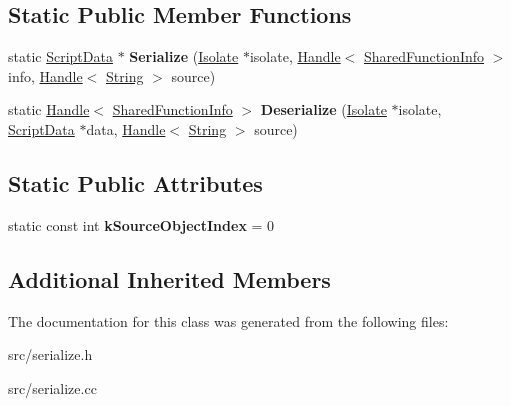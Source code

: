 \subsection*{Static Public Member Functions}
\begin{DoxyCompactItemize}
\item 
\hypertarget{classv8_1_1internal_1_1_code_serializer_a50ee2c69501e7cbac4400369ac2d88d6}{}static \hyperlink{classv8_1_1internal_1_1_script_data}{Script\+Data} $\ast$ {\bfseries Serialize} (\hyperlink{classv8_1_1internal_1_1_isolate}{Isolate} $\ast$isolate, \hyperlink{classv8_1_1internal_1_1_handle}{Handle}$<$ \hyperlink{classv8_1_1internal_1_1_shared_function_info}{Shared\+Function\+Info} $>$ info, \hyperlink{classv8_1_1internal_1_1_handle}{Handle}$<$ \hyperlink{classv8_1_1internal_1_1_string}{String} $>$ source)\label{classv8_1_1internal_1_1_code_serializer_a50ee2c69501e7cbac4400369ac2d88d6}

\item 
\hypertarget{classv8_1_1internal_1_1_code_serializer_ab8416a1971c2012355075bfefd659383}{}static \hyperlink{classv8_1_1internal_1_1_handle}{Handle}$<$ \hyperlink{classv8_1_1internal_1_1_shared_function_info}{Shared\+Function\+Info} $>$ {\bfseries Deserialize} (\hyperlink{classv8_1_1internal_1_1_isolate}{Isolate} $\ast$isolate, \hyperlink{classv8_1_1internal_1_1_script_data}{Script\+Data} $\ast$data, \hyperlink{classv8_1_1internal_1_1_handle}{Handle}$<$ \hyperlink{classv8_1_1internal_1_1_string}{String} $>$ source)\label{classv8_1_1internal_1_1_code_serializer_ab8416a1971c2012355075bfefd659383}

\end{DoxyCompactItemize}
\subsection*{Static Public Attributes}
\begin{DoxyCompactItemize}
\item 
\hypertarget{classv8_1_1internal_1_1_code_serializer_af522f36416ca441547ad26be622b850a}{}static const int {\bfseries k\+Source\+Object\+Index} = 0\label{classv8_1_1internal_1_1_code_serializer_af522f36416ca441547ad26be622b850a}

\end{DoxyCompactItemize}
\subsection*{Additional Inherited Members}


The documentation for this class was generated from the following files\+:\begin{DoxyCompactItemize}
\item 
src/serialize.\+h\item 
src/serialize.\+cc\end{DoxyCompactItemize}
